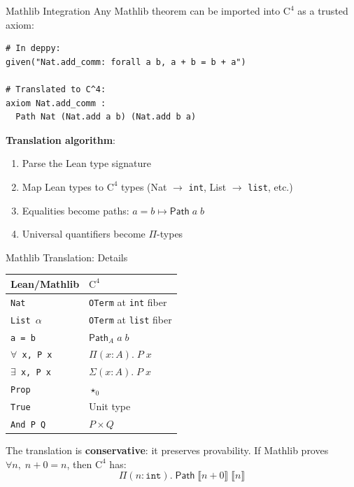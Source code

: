 \documentclass[aspectratio=169,11pt]{beamer}
\newcommand{\Cfour}{\mathrm{C}^4}
\newcommand{\Path}{\mathsf{Path}}
\newcommand{\den}[1]{\llbracket #1 \rrbracket}
\begin{document}
\begin{frame}{Mathlib Integration}
Any Mathlib theorem can be imported into $\Cfour$ as a trusted axiom:

\begin{lstlisting}[language=deppy, basicstyle=\small\ttfamily]
# In deppy:
given("Nat.add_comm: forall a b, a + b = b + a")

# Translated to C^4:
axiom Nat.add_comm :
  Path Nat (Nat.add a b) (Nat.add b a)
\end{lstlisting}

\vspace{0.5em}
\textbf{Translation algorithm}:
\begin{enumerate}
\item Parse the Lean type signature
\item Map Lean types to $\Cfour$ types (Nat $\to$ \texttt{int}, List $\to$ \texttt{list}, etc.)
\item Equalities become paths: $a = b \mapsto \Path\;a\;b$
\item Universal quantifiers become $\Pi$-types
\end{enumerate}
\end{frame}

\begin{frame}{Mathlib Translation: Details}
\small
\begin{center}
\begin{tabular}{ll}
\toprule
\textbf{Lean/Mathlib} & \textbf{$\Cfour$} \\
\midrule
\texttt{Nat} & \texttt{OTerm} at \texttt{int} fiber \\
\texttt{List $\alpha$} & \texttt{OTerm} at \texttt{list} fiber \\
\texttt{a = b} & $\Path_A\;a\;b$ \\
\texttt{$\forall$ x, P x} & $\Pi(x:A).\;P\;x$ \\
\texttt{$\exists$ x, P x} & $\Sigma(x:A).\;P\;x$ \\
\texttt{Prop} & $\star_0$ \\
\texttt{True} & Unit type \\
\texttt{And P Q} & $P \times Q$ \\
\bottomrule
\end{tabular}
\end{center}

\vspace{0.5em}
The translation is \textbf{conservative}: it preserves provability.
If Mathlib proves $\forall n,\; n + 0 = n$, then $\Cfour$ has:
\[
\Pi(n:\texttt{int}).\;\Path\;\den{n+0}\;\den{n}
\]
\end{frame}
\end{document}
